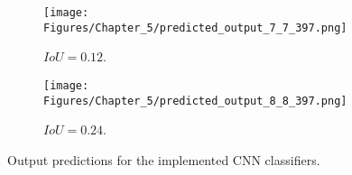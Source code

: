 \begin{figure} [h!]
\begin{subfigure}[b]{0.32\textwidth}
		\caption{}
		\label{fig:GT_case_397}
	\end{subfigure}
	\hfill
	\begin{subfigure}[b]{0.32\textwidth}
		\centering
		\texttt{[image: Figures/Chapter\_5/predicted\_output\_7\_7\_397.png]}
		\caption{\(IoU=0.12\).}
		\label{fig:pred_7_7_case_397}
	\end{subfigure}
	\hfill
	\begin{subfigure}[b]{0.32\textwidth}
		\centering
		\texttt{[image: Figures/Chapter\_5/predicted\_output\_8\_8\_397.png]}
		\caption{\(IoU=0.24\).}
		\label{fig:pred_8_8_case_397}
	\end{subfigure}
	\caption{Output predictions for the implemented CNN classifiers.}
	\label{fig:bounding_boxes_predictions}
\end{figure}
